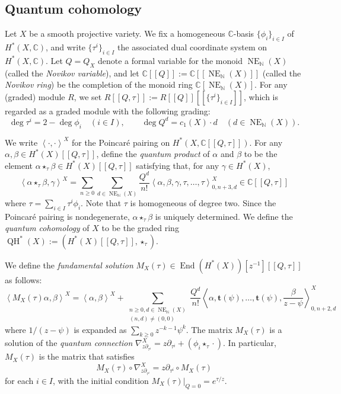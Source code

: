 \documentclass[a4paper,12pt]{amsart}
\numberwithin{equation}{section}
\theoremstyle{definition}
\newcommand{\C}{\mathbb{C}}
\newcommand{\N}{\mathbb{N}}
\newcommand{\bt}{\mathbf{t}}
\newcommand{\NE}{\operatorname{NE}_{\N}}
\newcommand{\End}{\operatorname{End}}
\newcommand{\QH}{\operatorname{QH}}
\def\corr#1{\left\langle#1 \right\rangle}
\begin{document}
\subsection{Quantum cohomology}
Let $X$ be a smooth projective variety.
We fix a homogeneous $\C$-basis $\{\phi_i\}_{i\in I}$ of $H^*(X,\C)$, and write $\{\tau^i\}_{i\in I}$ the associated dual coordinate system on $H^*(X,\C)$.
Let $Q=Q_X$ denote a formal variable for the monoid $\NE(X)$ (called the \emph{Novikov variable}), and let $\C[\![Q]\!]:=\C[\![\NE(X)]\!]$ (called the \emph{Novikov ring}) be the completion of the monoid ring $\C[\NE(X)]$.
For any (graded) module $R$, we set $R[\![Q,\tau]\!]:=R[\![Q]\!][\![\{\tau^i\}_{i\in I}]\!]$, which is regarded as a graded module with the following grading: 
\[
\deg\tau^i=2-\deg\phi_i \quad (i\in I), \qquad \deg Q^d=c_1(X)\cdot d \quad (d\in\NE(X)).
\]

We write $\corr{\cdot,\cdot}^X$ for the Poincar\'{e} pairing on $H^*(X,\C[\![Q,\tau]\!])$.
For any $\alpha,\beta\in H^*(X)[\![Q,\tau]\!]$, define the \emph{quantum product} of $\alpha$ and $\beta$ to be the element $\alpha\star_{\tau}\beta\in H^*(X)[\![Q,\tau]\!]$ satisfying that, for any $\gamma\in H^*(X)$,
\[
\corr{\alpha\star_{\tau}\beta,\gamma}^X = \sum_{n\geq0} \sum_{d\in\NE(X)} \frac{Q^d}{n!} \corr{\alpha,\beta,\gamma,\tau,\dots,\tau}^X_{0,n+3,d} \in \C[\![Q,\tau]\!]
\]
where $\tau=\sum_{i\in I}\tau^i\phi_i$.
Note that $\tau$ is homogeneous of degree two.
Since the Poincar\'{e} pairing is nondegenerate, $\alpha\star_{\tau}\beta$ is uniquely determined.
We define the \emph{quantum cohomology} of $X$ to be the graded ring $\QH^*(X):=(H^*(X)[\![Q,\tau]\!],\star_{\tau})$.

We define the \emph{fundamental solution} \cite{Givental:equivariant,Pandharipande:rational,CCIT:hodge} $M_X(\tau)\in \End(H^*(X))[z^{-1}][\![Q,\tau]\!]$ as follows:
\begin{equation}\label{eqn:fundamental_solution}
\corr{M_X(\tau)\alpha,\beta}^X = \corr{\alpha,\beta}^X + \sum_{ \substack{n\geq0,d\in\NE(X) \\ (n,d)\neq(0,0)} } \frac{Q^d}{n!} \corr{\alpha,\bt(\psi),\dots,\bt(\psi),\frac{\beta}{z-\psi}}^X_{0,n+2,d}
\end{equation}
where $1/(z-\psi)$ is expanded as $\sum_{k\geq0}z^{-k-1}\psi^k$.
The matrix $M_X(\tau)$ is a solution of the \emph{quantum connection} $\nabla^X_{z\partial_{\tau^i}}=z\partial_{\tau^i}+(\phi_i\star_\tau\cdot)$.
In particular, $M_X(\tau)$ is the matrix that satisfies 
\begin{equation}\label{fundamental solution}
M_X(\tau)\circ\nabla^X_{z\partial_{\tau^i}}=z\partial_{\tau^i}\circ M_X(\tau)    
\end{equation} 
for each $i\in I$, with the initial condition $M_X(\tau)|_{Q=0}=e^{\tau/z}$.
\end{document}
